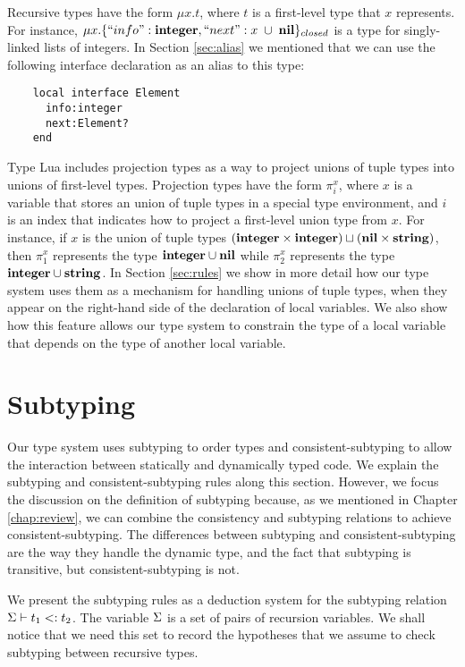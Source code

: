 Recursive types have the form $\mu x.t$,
where $t$ is a first-level type that $x$ represents.
For instance, $\mu x.\{``info":\mathbf{integer}, ``next":x \;\cup\; \mathbf{nil}\}_{closed}$
is a type for singly-linked lists of integers.
In Section \ref{sec:alias} we mentioned that we can use the following
interface declaration as an alias to this type:
\begin{verbatim}
    local interface Element
      info:integer
      next:Element?
    end
\end{verbatim}

Type Lua includes projection types as a way to project
unions of tuple types into unions of first-level types.
Projection types have the form $\pi_{i}^{x}$, where $x$ is a variable
that stores an union of tuple types in a special type environment,
and $i$ is an index that indicates how to project a first-level
union type from $x$.
For instance, if $x$ is the union of tuple types
$(\mathbf{integer} \times \mathbf{integer}) \sqcup (\mathbf{nil} \times \mathbf{string})$,
then $\pi_{1}^{x}$ represents the type $\mathbf{integer} \cup \mathbf{nil}$
while $\pi_{2}^{x}$ represents the type $\mathbf{integer} \cup \mathbf{string}$.
In Section \ref{sec:rules} we show in more detail how our type system
uses them as a mechanism for handling unions of tuple types,
when they appear on the right-hand side of the declaration of local variables.
We also show how this feature allows our type system to constrain
the type of a local variable that depends on the type of another local variable.

\section{Subtyping}
\label{sec:subtyping}

Our type system uses subtyping \citep{cardelli1984smi,abadi1996to} to order
types and consistent-subtyping \citep{siek2007objects,siek2013mutable}
to allow the interaction between statically and dynamically typed code.
We explain the subtyping and consistent-subtyping rules along this section.
However, we focus the discussion on the definition of subtyping because,
as we mentioned in Chapter \ref{chap:review}, we can combine the
consistency and subtyping relations to achieve consistent-subtyping.
The differences between subtyping and consistent-subtyping are the way
they handle the dynamic type, and the fact that subtyping is transitive,
but consistent-subtyping is not.

We present the subtyping rules as a deduction system for the
subtyping relation $\Sigma \vdash t_{1} <: t_{2}$.
The variable $\Sigma$ is a set of pairs of recursion variables.
We shall notice that we need this set to record the hypotheses
that we assume to check subtyping between recursive types.

